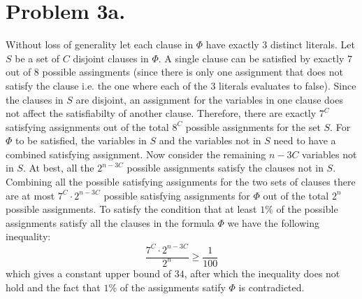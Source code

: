 \documentclass[12pt]{article}
\begin{document}
\section*{Problem 3a.}
Without loss of generality let each clause in $\Phi$ have exactly $3$
distinct literals. Let $S$ be a set of $C$ disjoint clauses in $\Phi$.
A single clause can be satisfied by exactly $7$ out of $8$ possible assingments
(since there is only one assignment that does not satisfy the clause i.e. the
one where each of the $3$ literals evaluates to false). Since the clauses in $S$
are disjoint, an assignment for the variables in one clause does not affect the
satisfiabilty of another clause. Therefore, there are exactly $7^C$ satisfying
assignments out of the total $8^C$ possible assignments for the set $S$. For
$\Phi$ to be satisfied, the variables in $S$ and the variables not in $S$ need
to have a combined satisfying assignment. Now consider the remaining $n-3C$
variables not in $S$. At best, all the $2^{n-3C}$ possible assignments satisfy
the clauses not in $S$. Combining all the possible satisfying assignments for
the two sets of clauses there are at most $7^C \cdot 2^{n-3C}$ possible
satisfying assignments for $\Phi$ out of the total $2^n$ possible assignments.
To satisfy the condition that at least $1\%$ of the possible assignments satisfy
all the clauses in the formula $\Phi$ we have the following inequality:
$$\frac{7^C \cdot 2^{n-3C}}{2^n} \ge \frac{1}{100} $$
which gives a constant upper bound of $34$, after which the inequality does not
hold and the fact that $1\%$ of the assignments satify $\Phi$ is contradicted.
\end{document}
